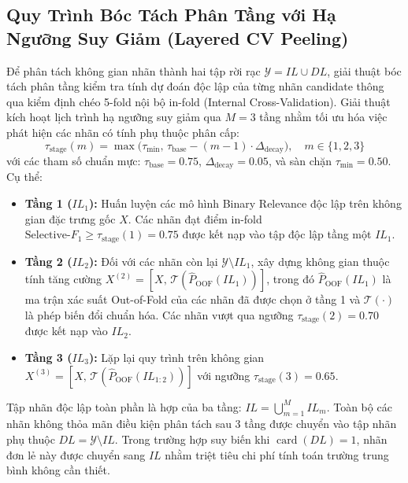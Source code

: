 \documentclass[10pt,a4paper]{article}
\begin{document}
\subsection{Quy Trình Bóc Tách Phân Tầng với Hạ Ngưỡng Suy Giảm (Layered CV Peeling)}
Để phân tách không gian nhãn thành hai tập rời rạc $\mathcal{Y} = IL \cup DL$, giải thuật bóc tách phân tầng kiểm tra tính dự đoán độc lập của từng nhãn candidate thông qua kiểm định chéo 5-fold nội bộ in-fold (Internal Cross-Validation). Giải thuật kích hoạt lịch trình hạ ngưỡng suy giảm qua $M=3$ tầng nhằm tối ưu hóa việc phát hiện các nhãn có tính phụ thuộc phân cấp:
\begin{equation}
    \tau_{\text{stage}}(m) = \max\Big(\tau_{\min}, \, \tau_{\text{base}} - (m - 1) \cdot \Delta_{\text{decay}}\Big), \quad m \in \{1, 2, 3\}
\end{equation}
với các tham số chuẩn mực: $\tau_{\text{base}} = 0.75$, $\Delta_{\text{decay}} = 0.05$, và sàn chặn $\tau_{\min} = 0.50$. Cụ thể:
\begin{itemize}[leftmargin=*]
    \item \textbf{Tầng 1 ($IL_1$):} Huấn luyện các mô hình Binary Relevance độc lập trên không gian đặc trưng gốc $X$. Các nhãn đạt điểm in-fold $\text{Selective-}F_1 \ge \tau_{\text{stage}}(1) = 0.75$ được kết nạp vào tập độc lập tầng một $IL_1$.
    \item \textbf{Tầng 2 ($IL_2$):} Đối với các nhãn còn lại $\mathcal{Y} \setminus IL_1$, xây dựng không gian thuộc tính tăng cường $X^{(2)} = [X, \, \mathcal{T}(\hat{P}_{\text{OOF}}(IL_1))]$, trong đó $\hat{P}_{\text{OOF}}(IL_1)$ là ma trận xác suất Out-of-Fold của các nhãn đã được chọn ở tầng 1 và $\mathcal{T}(\cdot)$ là phép biến đổi chuẩn hóa. Các nhãn vượt qua ngưỡng $\tau_{\text{stage}}(2) = 0.70$ được kết nạp vào $IL_2$.
    \item \textbf{Tầng 3 ($IL_3$):} Lặp lại quy trình trên không gian $X^{(3)} = [X, \, \mathcal{T}(\hat{P}_{\text{OOF}}(IL_{1:2}))]$ với ngưỡng $\tau_{\text{stage}}(3) = 0.65$.
\end{itemize}
Tập nhãn độc lập toàn phần là hợp của ba tầng: $IL = \bigcup_{m=1}^M IL_m$. Toàn bộ các nhãn không thỏa mãn điều kiện phân tách sau 3 tầng được chuyển vào tập nhãn phụ thuộc $DL = \mathcal{Y} \setminus IL$. Trong trường hợp suy biến khi $\operatorname{card}(DL) = 1$, nhãn đơn lẻ này được chuyển sang $IL$ nhằm triệt tiêu chi phí tính toán trường trung bình không cần thiết.
\end{document}
